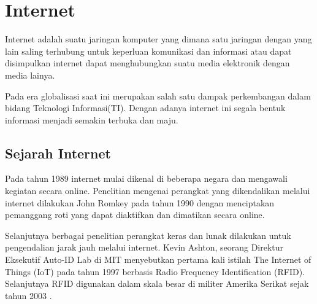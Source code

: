 \section{Internet}
Internet adalah suatu jaringan komputer yang dimana satu jaringan dengan yang lain saling terhubung untuk keperluan komunikasi dan informasi atau dapat disimpulkan internet dapat menghubungkan suatu media elektronik dengan media lainya.

Pada era globalisasi saat ini merupakan salah satu dampak perkembangan dalam bidang Teknologi Informasi(TI). Dengan adanya internet ini segala bentuk informasi menjadi semakin terbuka dan maju.

\subsection{Sejarah Internet}
Pada tahun 1989 internet mulai dikenal di beberapa negara dan mengawali kegiatan secara online.
Penelitian mengenai perangkat yang dikendalikan melalui internet dilakukan John Romkey pada tahun 1990 
dengan menciptakan  pemanggang roti yang dapat diaktifkan dan dimatikan secara online.

Selanjutnya berbagai penelitian  perangkat  keras  dan  lunak dilakukan untuk pengendalian jarak jauh melalui internet.
Kevin Ashton, seorang Direktur Eksekutif Auto-ID Lab di MIT menyebutkan pertama kali istilah The Internet of Things (IoT)
pada tahun 1997 berbasis Radio Frequency  Identification (RFID). Selanjutnya  RFID digunakan dalam skala besar di militer
Amerika Serikat sejak tahun 2003 \cite{wilianto2018sejarah}.

